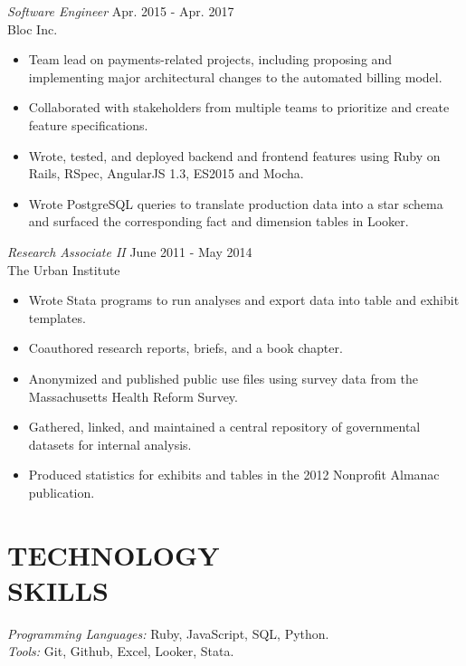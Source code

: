 \documentclass[margin, 10pt]{res} %
\begin{document}
\begin{resume}
{\sl Software Engineer} \hfill Apr. 2015 - Apr. 2017 \\
Bloc Inc.
\begin{itemize} \itemsep -2pt %
\item Team lead on payments-related projects, including proposing and implementing major architectural changes to the automated billing model.
\item Collaborated with stakeholders from multiple teams to prioritize and create feature specifications.
\item Wrote, tested, and deployed backend and frontend features using Ruby on Rails, RSpec, AngularJS 1.3, ES2015 and Mocha.
\item Wrote PostgreSQL queries to translate production data into a star schema and surfaced the corresponding fact and dimension tables in Looker.
\end{itemize}

{\sl  Research Associate II } \hfill June 2011 - May 2014\\
The Urban Institute
\begin{itemize} \itemsep -2pt %
\item Wrote Stata programs to run analyses and export data into table and exhibit templates.
\item Coauthored research reports, briefs, and a book chapter.
\item Anonymized and published public use files using survey data from the Massachusetts Health Reform Survey.
\item Gathered, linked, and maintained a central repository of governmental datasets for internal analysis.
\item Produced statistics for exhibits and tables in the 2012 Nonprofit Almanac publication.
\end{itemize}


\section{\small\bf TECHNOLOGY \\ SKILLS}

{\sl Programming Languages:} Ruby, JavaScript, SQL, Python. \\
{\sl Tools:} Git, Github, Excel, Looker, Stata. \\


\end{resume}
\end{document}
